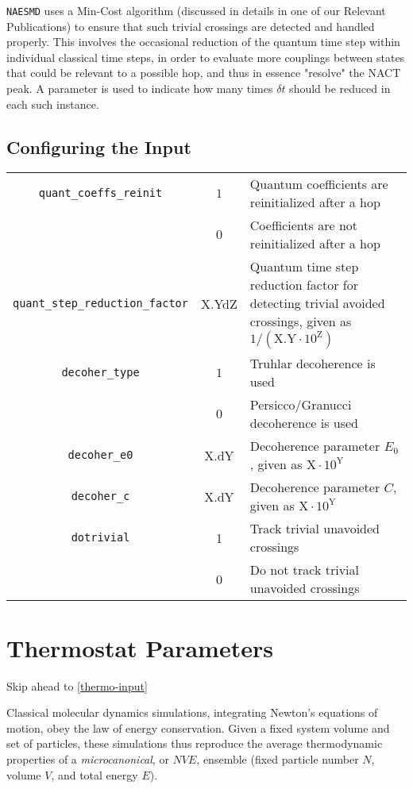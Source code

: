 \documentclass[12pt,letter,footinclude=true,headinclude=true,hyphens]{book} %
\begin{document}
    \texttt{NAESMD} uses a Min-Cost algorithm (discussed in details in one of our Relevant Publications) to ensure that such trivial crossings are detected and handled properly. This involves the occasional reduction of the quantum time step within individual classical time steps, in order to evaluate more couplings between states that could be relevant to a possible hop, and thus in essence "resolve" the NACT peak. A parameter is used to indicate how many times $\delta t$ should be reduced in each such instance.
    
    \subsection{Configuring the Input}
    \label{na-input}
    
    \begin{tabular}{ | c | c | p{7cm} | }
    \hline
    \texttt{quant\_coeffs\_reinit} & $1$ & Quantum coefficients are reinitialized after a hop \\
    & $0$ & Coefficients are not reinitialized after a hop \\ \hline
    \texttt{quant\_step\_reduction\_factor} & X.YdZ & Quantum time step reduction factor for detecting trivial avoided crossings, given as $1/ (\textrm{X.Y} \cdot 10^{\textrm{Z}})$ \\ \hline
    \texttt{decoher\_type} & $1$ & Truhlar decoherence is used \\
    & $0$ & Persicco/Granucci decoherence is used \\ \hline
    \texttt{decoher\_e0} & X.dY & Decoherence parameter $E_0$, given as $\textrm{X} \cdot 10^\textrm{Y}$ \\ \hline
    \texttt{decoher\_c} & X.dY & Decoherence parameter $C$, given as $\textrm{X} \cdot 10^\textrm{Y}$ \\ \hline
        \texttt{dotrivial} & 1 & Track trivial unavoided crossings \\
        & 0 & Do not track trivial unavoided crossings \\ \hline
    \end{tabular}
    
    \section{Thermostat Parameters}
    
    Skip ahead to \ref{thermo-input}
    
    Classical molecular dynamics simulations, integrating Newton's equations of motion, obey the law of energy conservation. Given a fixed system volume and set of particles, these simulations thus reproduce the average thermodynamic properties of a \emph{microcanonical}, or $NVE$, ensemble (fixed particle number $N$, volume $V$, and total energy $E$).
    
\end{document}
